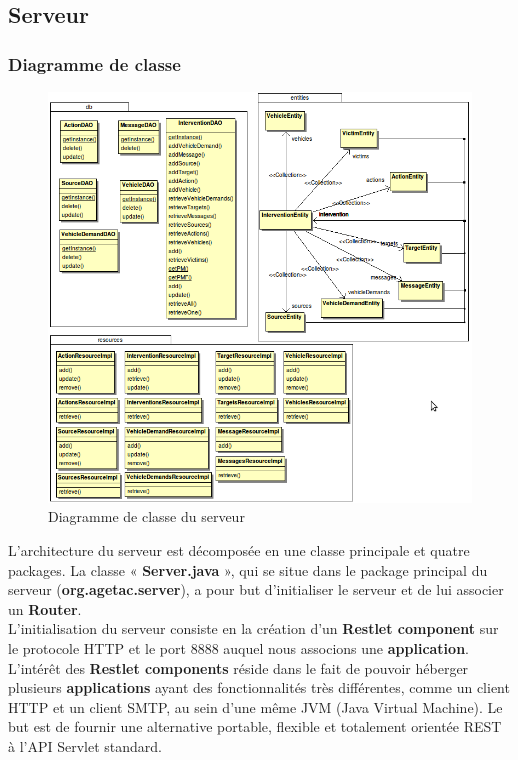 \documentclass{article}
\begin{document}
\newpage
\subsection{Serveur}

\subsubsection{Diagramme de classe}

\begin{figure}[htbp]
\begin{center}
\includegraphics[width=460pt]{doc_dev-fig011.png}
\caption{Diagramme de classe du serveur}
\end{center}
\end{figure}

L'architecture du serveur est décomposée en une classe principale et quatre packages.
La classe « \textbf{Server.java} », qui se situe dans le package principal du serveur (\textbf{org.agetac.server}), a pour but d'initialiser le serveur et de lui associer un \textbf{Router}.\\


L'initialisation du serveur consiste en la création d'un \textbf{Restlet component} sur le protocole HTTP et le port 8888 auquel nous associons une \textbf{application}. L'intérêt des \textbf{Restlet components} réside dans le fait de pouvoir héberger plusieurs \textbf{applications} ayant des fonctionnalités très différentes, comme un client HTTP et un client SMTP, au sein d'une même JVM (Java Virtual Machine). Le but est de fournir une alternative portable, flexible et totalement orientée REST à l'API Servlet standard.\\
\end{document}
